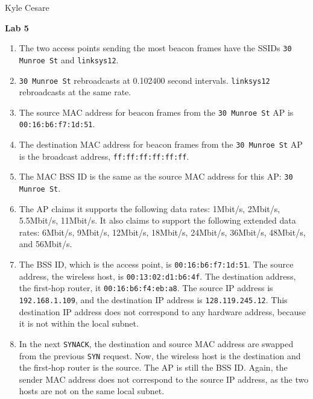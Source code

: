 \documentclass[11pt]{article}
\begin{document}
\begin{flushright}
  Kyle Cesare
\end{flushright}

{\center \textbf{Lab 5} \\}

\begin{enumerate}
  \item The two access points sending the most beacon frames have the SSIDs
    \texttt{30 Munroe St} and \texttt{linksys12}.

  \item \texttt{30 Munroe St} rebroadcasts at 0.102400 second intervals.
    \texttt{linksys12} rebroadcasts at the same rate.

  \item The source MAC address for beacon frames from the \texttt{30 Munroe
    St} AP is \texttt{00:16:b6:f7:1d:51}.

  \item The destination MAC address for beacon frames from the \texttt{30 Munroe
    St} AP is the broadcast address, \texttt{ff:ff:ff:ff:ff:ff}.

  \item The MAC BSS ID is the same as the source MAC address for this AP:
    \texttt{30 Munroe St}.

  \item The AP claims it supports the following data rates: 1Mbit/s, 2Mbit/s,
    5.5Mbit/s, 11Mbit/s.  It also claims to support the following extended data
    rates: 6Mbit/s, 9Mbit/s, 12Mbit/s, 18Mbit/s, 24Mbit/s, 36Mbit/s, 48Mbit/s,
    and 56Mbit/s.

  \item The BSS ID, which is the access point, is \texttt{00:16:b6:f7:1d:51}.
    The source address, the wireless host, is \texttt{00:13:02:d1:b6:4f}.  The
    destination address, the first-hop router, it \texttt{00:16:b6:f4:eb:a8}.
    The source IP address is \texttt{192.168.1.109}, and the destination IP
    address is \texttt{128.119.245.12}.  This destination IP address does not
    correspond to any hardware address, because it is not within the local
    subnet.

  \item In the next \texttt{SYNACK}, the destination and source MAC address are
    swapped from the previous \texttt{SYN} request.  Now, the wireless host is
    the destination and the first-hop router is the source.  The AP is still the
    BSS ID.  Again, the sender MAC address does not correspond to the source IP
    address, as the two hosts are not on the same local subnet.


\end{enumerate}
\end{document}

